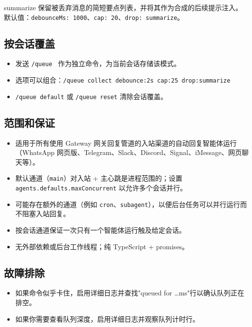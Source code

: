 summarize 保留被丢弃消息的简短要点列表，并将其作为合成的后续提示注入。
默认值：\texttt{debounceMs: 1000}、\texttt{cap: 20}、\texttt{drop: summarize}。

\subsection{按会话覆盖}


\begin{itemize}
  \item 发送 \texttt{/queue } 作为独立命令，为当前会话存储该模式。
  \item 选项可以组合：\texttt{/queue collect debounce:2s cap:25 drop:summarize}
  \item \texttt{/queue default} 或 \texttt{/queue reset} 清除会话覆盖。
\end{itemize}


\subsection{范围和保证}


\begin{itemize}
  \item 适用于所有使用 Gateway 网关回复管道的入站渠道的自动回复智能体运行（WhatsApp 网页版、Telegram、Slack、Discord、Signal、iMessage、网页聊天等）。
  \item 默认通道（\texttt{main}）对入站 + 主心跳是进程范围的；设置 \texttt{agents.defaults.maxConcurrent} 以允许多个会话并行。
  \item 可能存在额外的通道（例如 \texttt{cron}、\texttt{subagent}），以便后台任务可以并行运行而不阻塞入站回复。
  \item 按会话通道保证一次只有一个智能体运行触及给定会话。
  \item 无外部依赖或后台工作线程；纯 TypeScript + promises。
\end{itemize}


\subsection{故障排除}


\begin{itemize}
  \item 如果命令似乎卡住，启用详细日志并查找"queued for …ms"行以确认队列正在排空。
  \item 如果你需要查看队列深度，启用详细日志并观察队列计时行。
\end{itemize}



